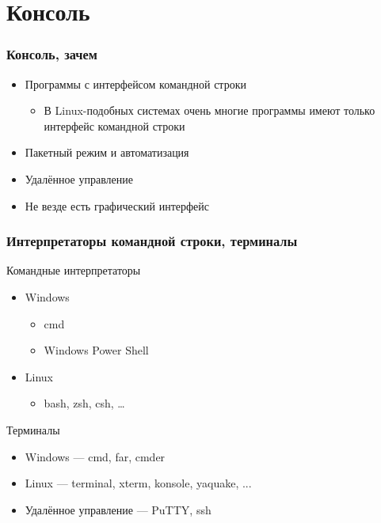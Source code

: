 \documentclass{../../slides-style}
\begin{document}
    
    \begin{frame}[plain]
        \titlepage
    \end{frame}

    \section{Консоль}

    \begin{frame}
        \frametitle{Консоль, зачем}
        \begin{itemize}
            \item Программы с интерфейсом командной строки
            \begin{itemize}
                \item В Linux-подобных системах очень многие программы имеют только интерфейс командной строки
            \end{itemize}
            \item Пакетный режим и автоматизация
            \item Удалённое управление
            \item Не везде есть графический интерфейс
        \end{itemize}
    \end{frame}

    \begin{frame}
        \frametitle{Интерпретаторы командной строки, терминалы}
        Командные интерпретаторы
        \begin{itemize}
            \item Windows
            \begin{itemize}
                \item cmd
                \item Windows Power Shell
            \end{itemize}
            \item Linux
            \begin{itemize}
                \item bash, zsh, csh, …
            \end{itemize}
        \end{itemize}
        Терминалы
        \begin{itemize}
            \item Windows --- cmd, far, cmder
            \item Linux --- terminal, xterm, konsole, yaquake, ...
            \item Удалённое управление --- PuTTY, ssh
        \end{itemize}
    \end{frame}
\end{document}
